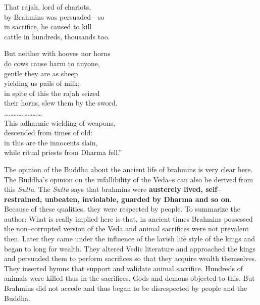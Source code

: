 That rajah, lord of chariots,\\ by Brahmins was persuaded—so\\ in sacrifice, he caused to kill\\ cattle in hundreds, thousands too.

But neither with hooves nor horns\\ do cows cause harm to anyone,\\ gentle they are as sheep\\ yielding us pails of milk;\\ in spite of this the rajah seized\\ their horns, slew them by the sword.\\ ……………………\\ This adharmic wielding of weapons,\\ descended from times of old:\\ in this are the innocents slain,\\ while ritual priests from Dharma fell.”

The opinion of the Buddha about the ancient life of brahmins is very clear here. The Buddha’s opinion on the infallibility of the Veda–s can also be derived from this \textit{Sutta}. The \textit{Sutta} says that brahmins were \textbf{austerely lived, self–restrained, unbeaten, inviolable, guarded by Dharma and so on}. Because of these qualities, they were respected by people. To summarize the author: What is really implied here is that, in ancient times Brahmins possessed the non–corrupted version of the Veda and animal sacrifices were not prevalent then. Later they came under the influence of the lavish life style of the kings and began to long for wealth. They altered Vedic literature and approached the kings and persuaded them to perform sacrifices so that they acquire wealth themselves. They inserted hymns that support and validate animal sacrifice. Hundreds of animals were killed thus in the sacrifices. Gods and demons objected to this. But Brahmins did not accede and thus began to be disrespected by people and the Buddha.

